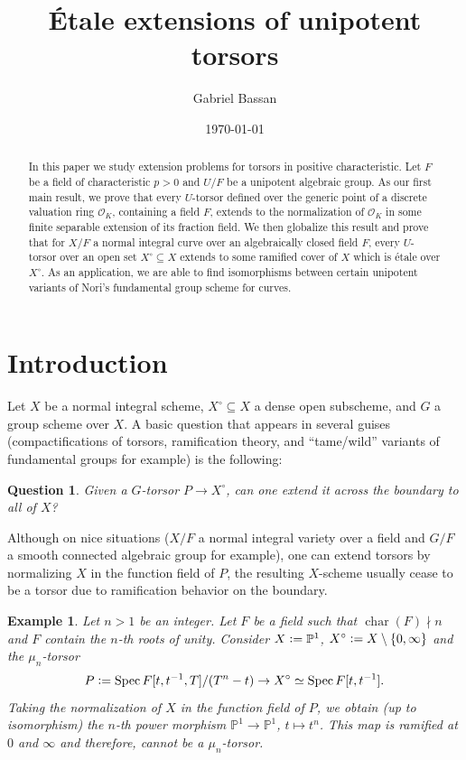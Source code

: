 \documentclass[a4paper,english,12pt]{amsart}
\title{Étale extensions of unipotent torsors}
\author{Gabriel Bassan}
\date{\today}
\newtheorem*{question}{Question}
\newtheorem*{example2}{Example}
\numberwithin{equation}{section}
\newcommand{\defeq}{\vcentcolon=}
\DeclareMathOperator{\Spec}{Spec}
\renewcommand{\_}{\rule{0.25cm}{0.4pt}}
\begin{document}
\begin{abstract}
In this paper we study extension problems for torsors in positive characteristic. Let $F$ be a field of characteristic $p>0$ and $U/F$ be a unipotent algebraic group. As our first main result, we prove that every $U$-torsor defined over the generic point of a discrete valuation ring $\mathcal{O}_{K}$, containing a field $F$, extends to the normalization of $\mathcal{O}_{K}$ in some finite separable extension of its fraction field. We then globalize this result and prove that for $X/F$ a normal integral curve over an algebraically closed field $F$, every $U$-torsor over an open set $X^{\circ}\subseteq X$ extends to some ramified cover of $X$ which is étale over $X^{\circ}$. As an application, we are able to find isomorphisms between certain unipotent variants of Nori's fundamental group scheme for curves.
\end{abstract}

\maketitle

\tableofcontents

\section*{Introduction}

Let $X$ be a normal integral scheme, $X^{\circ} \subseteq X$ a dense open subscheme, and $G$ a group scheme over $X$.  A basic question that appears in several guises (compactifications of torsors, ramification theory, and “tame/wild” variants of fundamental groups for example) is the following:

\begin{question}
Given a $G$-torsor $P \to X^{\circ}$, can one extend it across the boundary to all of $X$?
\end{question}

Although on nice situations ($X/F$ a normal integral variety over a field and $G/F$ a smooth connected algebraic group for example), one can extend torsors by normalizing $X$ in the function field of $P$, the resulting $X$-scheme usually cease to be a torsor due to ramification behavior on the boundary.

\begin{example2}
Let $n>1$ be an integer. Let $F$ be a field such that $\operatorname{char}(F)\nmid n$ and $F$ contain the $n$-th roots of unity. Consider $X\defeq\mathbb{P}^{1}$, $X^{\circ}\defeq X\setminus\{0,\infty\}$ and the $\mu_{n}$-torsor
\[
P\defeq \Spec F[t,t^{-1},T]/(T^{n}-t)\to X^{\circ}\simeq \Spec F[t,t^{-1}].
\]
Taking the normalization of $X$ in the function field of $P$, we obtain (up to isomorphism) the $n$-th power morphism $\mathbb{P}^{1}\to \mathbb{P}^{1}$, $t\mapsto t^{n}$. This map is ramified at $0$ and $\infty$ and therefore, cannot be a $\mu_{n}$-torsor.
\end{example2}
\end{document}
